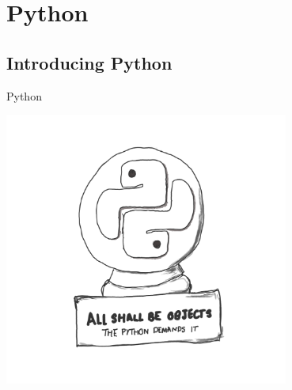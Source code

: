 \documentclass[10pt]{beamer}
\begin{document}
\section{Python}
\label{sec:orgb885aa3}

\subsection{Introducing Python}
\label{sec:orgb0000f3}

\begin{frame}[label={sec:org0e66dec}]{Python}
\begin{center}
\includegraphics[width=0.7\textwidth]{./images/python-objects.png}
\end{center}
\end{frame}
\end{document}
